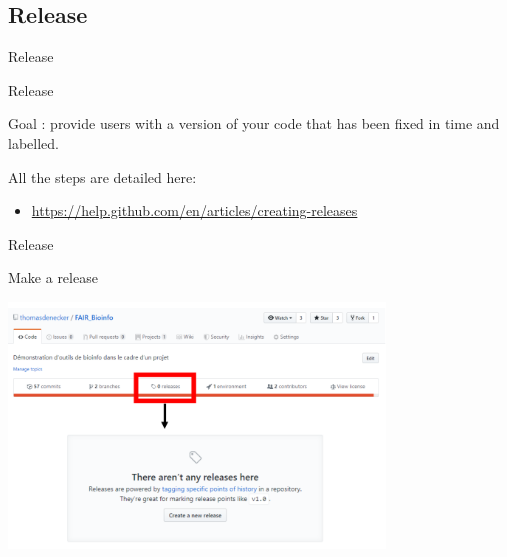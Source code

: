 \subsection{Release}

\begin{frame}{}

\huge{Release}

\end{frame}

\begin{frame}{Release}

Goal : provide users with a version of your code that has been fixed in time and labelled.

All the steps are detailed here:

\begin{itemize}
    \item \url{https://help.github.com/en/articles/creating-releases}
\end{itemize}

\end{frame}

\begin{frame}{Release}

Make a release

\begin{center}
    \includegraphics[width=10cm]{08_sharing/images/github_release.png}
\end{center}

\end{frame}

